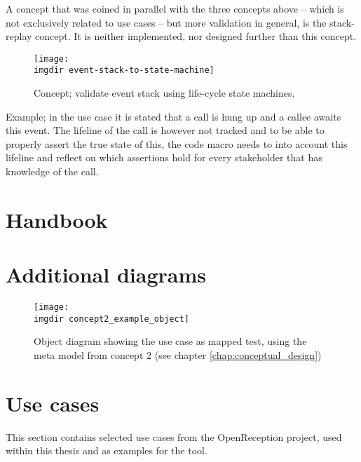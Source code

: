 A concept that was coined in parallel with the three concepts above -- which is not exclusively related to use cases -- but more validation in general, is the stack-replay concept. It is neither implemented, nor designed further than this concept.
\begin{figure}[ht]
\centering
\texttt{[image: \\imgdir event-stack-to-state-machine]}
\caption{Concept; validate event stack using life-cycle state machines.}
\label{fig:event-stack-to-state-machine}
\end{figure}
Example; in the use case it is stated that a call is hung up and a callee awaits this event. The lifeline of the call is however not tracked and to be able to properly assert the true state of this, the code macro needs to into account this lifeline and reflect on which assertions hold for every stakeholder that has knowledge of the call. %





\chapter{Handbook}

\chapter{Additional diagrams}

\begin{figure}[!htbp]
  \centering
  \texttt{[image: \\imgdir concept2\_example\_object]}
  \caption{Object diagram showing the use case as mapped test, using the meta model from concept 2 (see chapter \ref{chap:conceptual_design})}
  \label{fig:concept2_example_object}
\end{figure}

\chapter{Use cases}
\label{appendix:use-cases}
This section contains selected use cases from the OpenReception project, used within this thesis and as examples for the tool.


